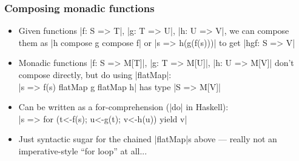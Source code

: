 \documentclass[mathserif,handout]{beamer}
\begin{document}

\begin{frame}[fragile]
  \frametitle{Composing monadic functions}
  \begin{itemize}
  \item Given functions |f: S => T|, |g: T => U|, |h: U => V|, we can compose them as |h compose g compose f| or |s => h(g(f(s)))| to get |hgf: S => V|
  \item Monadic functions |f: S => M[T]|, |g: T => M[U]|, |h: U => M[V]| don't compose directly, but do using |flatMap|:\\
    |s => f(s) flatMap g flatMap h| has type |S => M[V]|
  \item Can be written as a \alert{for-comprehension} (|do| in Haskell):\\
    |s => for (t<-f(s); u<-g(t); v<-h(u)) yield v|
    \item Just syntactic sugar for the chained |flatMap|s above --- really \alert{not} an imperative-style ``for loop'' at all...
  \end{itemize}
\end{frame}
\end{document}
